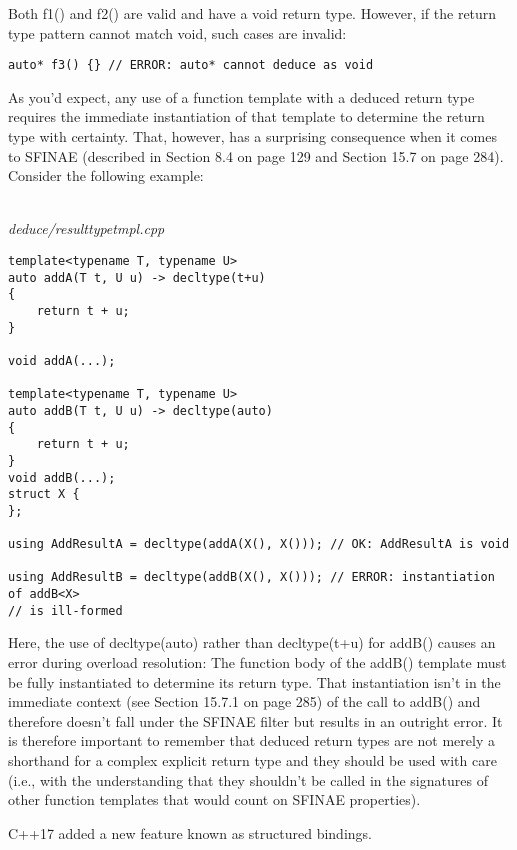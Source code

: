 Both f1() and f2() are valid and have a void return type. However, if the return type pattern cannot match void, such cases are invalid:

\begin{lstlisting}[style=styleCXX]
auto* f3() {} // ERROR: auto* cannot deduce as void
\end{lstlisting}

As you’d expect, any use of a function template with a deduced return type requires the immediate instantiation of that template to determine the return type with certainty. That, however, has a surprising consequence when it comes to SFINAE (described in Section 8.4 on page 129 and Section 15.7 on page 284). Consider the following example:

\hspace*{\fill} \\ %
\noindent
\textit{deduce/resulttypetmpl.cpp}
\begin{lstlisting}[style=styleCXX]
template<typename T, typename U>
auto addA(T t, U u) -> decltype(t+u)
{
	return t + u;
}

void addA(...);

template<typename T, typename U>
auto addB(T t, U u) -> decltype(auto)
{
	return t + u;
}
void addB(...);
struct X {
};

using AddResultA = decltype(addA(X(), X())); // OK: AddResultA is void

using AddResultB = decltype(addB(X(), X())); // ERROR: instantiation of addB<X>
// is ill-formed
\end{lstlisting}

Here, the use of decltype(auto) rather than decltype(t+u) for addB() causes an error during overload resolution: The function body of the addB() template must be fully instantiated to determine its return type. That instantiation isn’t in the immediate context (see Section 15.7.1 on page 285) of the call to addB() and therefore doesn’t fall under the SFINAE filter but results in an outright error. It is therefore important to remember that deduced return types are not merely a shorthand for a complex explicit return type and they should be used with care (i.e., with the understanding that they shouldn’t be called in the signatures of other function templates that would count on SFINAE properties).


C++17 added a new feature known as structured bindings.

